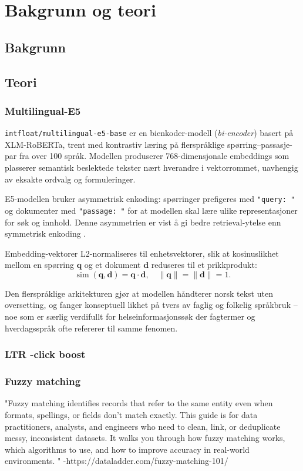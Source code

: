 \section{Bakgrunn og teori}

\subsection{Bakgrunn}

\subsection{Teori}

\subsubsection{Multilingual-E5}
\label{sec:multilingual-e5}

\texttt{intfloat/multilingual-e5-base} \cite{wang2024multilingual} er en
bienkoder-modell (\textit{bi-encoder}) basert på XLM-RoBERTa, trent med
kontrastiv læring på flerspråklige spørring--passasje-par fra over 100 språk.
Modellen produserer 768-dimensjonale embeddings som plasserer semantisk
beslektede tekster nært hverandre i vektorrommet, uavhengig av eksakte
ordvalg og formuleringer.

E5-modellen bruker asymmetrisk enkoding: spørringer prefigeres med
\texttt{"query:~"} og dokumenter med \texttt{"passage:~"} for at modellen skal
lære ulike representasjoner for søk og innhold. Denne asymmetrien er vist å
gi bedre retrieval-ytelse enn symmetrisk enkoding
\cite{wang2024multilingual}.

Embedding-vektorer L2-normaliseres til enhetsvektorer, slik at kosinuslikhet
mellom en spørring $\mathbf{q}$ og et dokument $\mathbf{d}$ reduseres til
et prikkprodukt:
\[
\operatorname{sim}(\mathbf{q}, \mathbf{d}) = \mathbf{q} \cdot \mathbf{d},
\quad \|\mathbf{q}\| = \|\mathbf{d}\| = 1.
\]

Den flerspråklige arkitekturen gjør at modellen håndterer norsk tekst uten
oversetting, og fanger konseptuell likhet på tvers av faglig og folkelig
språkbruk -- noe som er særlig verdifullt for helseinformasjonssøk der
fagtermer og hverdagsspråk ofte refererer til samme fenomen.

\subsubsection{LTR -click boost}


\subsubsection{Fuzzy matching}
"Fuzzy matching identifies records that refer to the same entity even when formats, spellings, or fields don’t match exactly. This guide is for data practitioners, analysts, and engineers who need to clean, link, or deduplicate messy, inconsistent datasets. It walks you through how fuzzy matching works, which algorithms to use, and how to improve accuracy in real-world environments. " -https://dataladder.com/fuzzy-matching-101/



